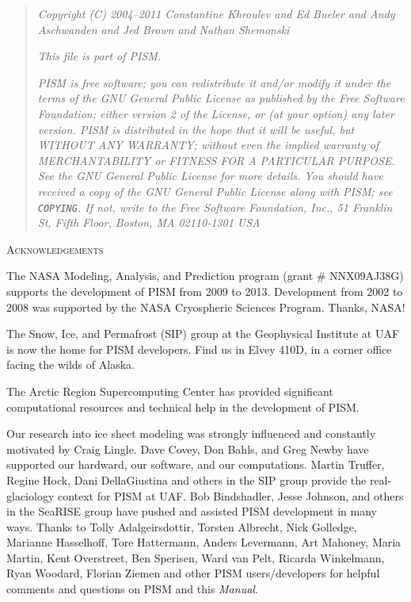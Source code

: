 \documentclass[titlepage,letterpaper,final]{scrartcl}
\newcommand{\normalspacing}{\renewcommand{\baselinestretch}{1.1}\tiny\normalsize}
\begin{document}
\phantom{bob}
\vspace{1.0in}
\begin{quote}
\textsl{Copyright (C) 2004--2011 Constantine Khroulev and Ed Bueler and Andy Aschwanden and Jed Brown and Nathan Shemonski}
\medskip

\noindent \textsl{This file is part of PISM.}
\medskip

\noindent \textsl{PISM is free software; you can redistribute it and/or modify it under the terms of the GNU General Public License as published by the Free Software Foundation; either version 2 of the License, or (at your option) any later version.  PISM is distributed in the hope that it will be useful, but WITHOUT ANY WARRANTY; without even the implied warranty of MERCHANTABILITY or FITNESS FOR A PARTICULAR PURPOSE.  See the GNU General Public License for more details.  You should have received a copy of the GNU General Public License along with PISM; see \emph{\texttt{COPYING}}.  If not, write to the Free Software Foundation, Inc., 51 Franklin St, Fifth Floor, Boston, MA  02110-1301 USA}
\end{quote}
\vspace{0.6in}
\normalspacing


\centerline{\textsc{Acknowledgements}}
\bigskip

\small
The NASA Modeling, Analysis, and Prediction program (grant \# NNX09AJ38G) supports the development of PISM from 2009 to 2013.  Development from 2002 to 2008 was supported by the NASA Cryospheric Sciences Program.  Thanks, NASA!

The Snow, Ice, and Permafrost (SIP) group at the Geophysical Institute at UAF is now the home for PISM developers.  Find us in Elvey 410D, in a corner office facing the wilds of Alaska.

The Arctic Region Supercomputing Center has provided significant computational resources and technical help in the development of PISM.

Our research into ice sheet modeling was strongly influenced and constantly motivated by Craig Lingle.  Dave Covey, Don Bahls, and Greg Newby have supported our hardward, our software, and our computations.  Martin Truffer, Regine Hock, Dani DellaGiustina and others in the SIP group provide the real-glaciology context for PISM at UAF.  Bob Bindshadler, Jesse Johnson, and others in the SeaRISE group have pushed and assisted PISM development in many ways.  Thanks to Tolly Adalgeirsdottir, Torsten Albrecht, Nick Golledge, Marianne Hasselhoff, Tore Hattermann, Anders Levermann, Art Mahoney, Maria Martin, Kent Overstreet, Ben Sperisen, Ward van Pelt, Ricarda Winkelmann, Ryan Woodard, Florian Ziemen and other PISM users/developers for helpful comments and questions on PISM and this \emph{Manual}.
\normalsize
\end{document}
